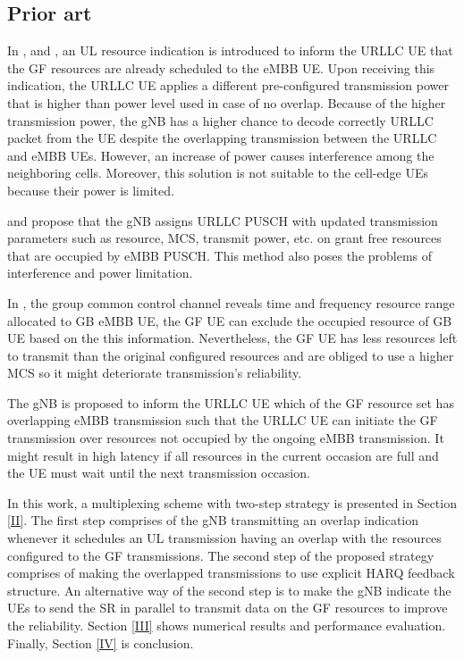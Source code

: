 \documentclass[conference]{IEEEtran}
\begin{document}
\subsection{Prior art}\label{ICC}
In \cite{b1}, \cite{b2} and \cite{b3}, an UL resource indication is introduced to inform the URLLC UE that the GF resources are already scheduled to the eMBB UE. Upon receiving this indication, the URLLC UE applies a different pre-configured transmission power that is higher than power level used in case of no overlap. Because of the higher transmission power, the gNB has a higher chance to decode correctly URLLC packet from the UE despite the overlapping transmission between the URLLC and eMBB UEs. However, an increase of power causes interference among the neighboring cells. Moreover, this solution is not suitable to the cell-edge UEs because their power is limited.

\cite{b4} and \cite{b5} propose that the gNB assigns URLLC PUSCH with updated transmission parameters such as resource, MCS, transmit power, etc. on grant free resources that are occupied by eMBB PUSCH. This method also poses the problems of interference and power limitation. 

In \cite{b7}, the group common control channel reveals time and frequency resource range allocated to GB eMBB UE, the GF UE can exclude the occupied resource of GB UE based on the this information. Nevertheless, the GF UE has less resources left to transmit than the original configured resources and are obliged to use a higher MCS so it might deteriorate transmission's reliability.

The gNB is proposed to inform the URLLC UE which of the GF resource set has overlapping eMBB transmission such that the URLLC UE can initiate the GF transmission over resources not occupied by the ongoing eMBB transmission. It might result in high latency if all resources in the current occasion are full and the UE must wait until the next transmission occasion\cite{b9}.

In this work, a multiplexing scheme with two-step strategy is presented in Section \ref{II}. The first step comprises of the gNB transmitting an overlap indication whenever it schedules an UL transmission having an overlap with the resources configured to the GF transmissions. The second step of the proposed strategy comprises of making the overlapped transmissions to use explicit HARQ feedback structure. An alternative way of the second step is to make the gNB indicate the UEs to send the SR in parallel to transmit data on the GF resources to improve the reliability. Section \ref{III} shows numerical results and performance evaluation. Finally, Section \ref{IV} is conclusion.
\end{document}
